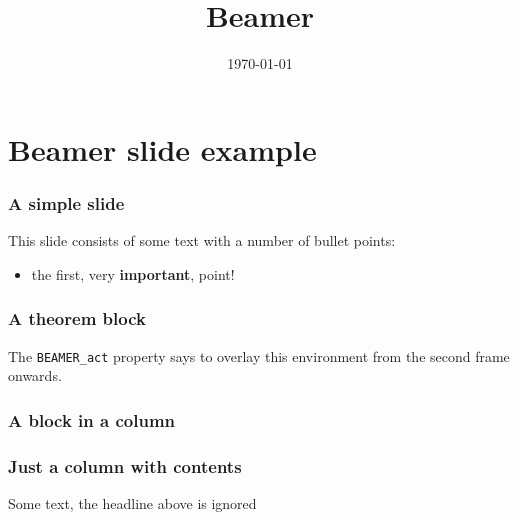 \documentclass[presentation]{beamer}
\date{\today}
\title{Beamer}
\begin{document}
\maketitle

\section{Beamer slide example}
\label{sec-1}

\begin{frame}[fragile]\frametitle{A simple slide}
\label{sec-1-1}

This slide consists of some text with a number of bullet points:
\begin{itemize}
\item the first, very \textbf{important}, point!
\end{itemize}
\end{frame}
\begin{frame}[fragile]\frametitle{A theorem block}
\label{sec-1-2}

The \texttt{BEAMER\_act} property says to overlay this environment from the
second frame onwards.
\end{frame}
\begin{frame}[fragile]\frametitle{A block in a column}
\label{sec-1-3}

\end{frame}
\begin{frame}[fragile]\frametitle{Just a column with contents}
\label{sec-1-4}
Some text, the headline above is ignored
\end{frame}
\end{document}
